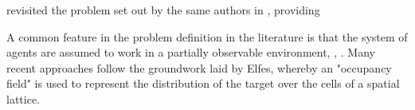 \cite{Chung2012AnalysisStrategies} revisited the problem set out by the same authors in \cite{Chung2007ASearch}, providing 

A common feature in the problem definition in the literature is that the system of agents are assumed to work in a partially observable environment\cite{Symington2010ProbabilisticRAVs}, \cite{Chung2008Multi-agentFramework}, \cite{WongMulti-vehicleTargets}. Many recent approaches follow the groundwork laid by Elfes\cite{ElfesUsingNavigation}, whereby an "occupancy field" is used to represent the distribution of the target over the cells of a spatial lattice.